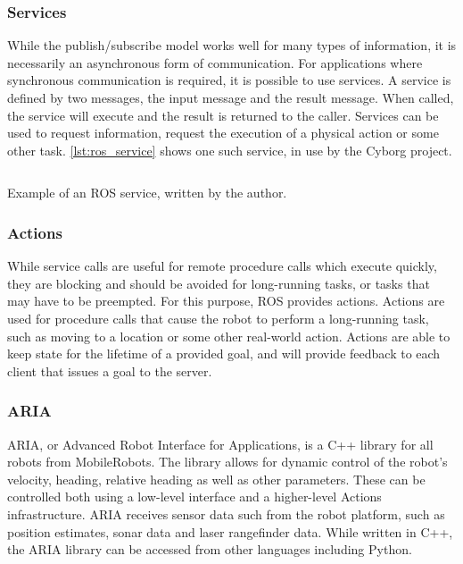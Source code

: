 \documentclass[\rootfolder/main.tex]{subfiles}
\begin{document}
\subsubsection{Services}

While the publish/subscribe model works well for many types of information, it is necessarily an asynchronous form of communication.
For applications where synchronous communication is required, it is possible to use services.
A service is defined by two messages, the input message and the result message.
When called, the service will execute and the result is returned to the caller.
Services can be used to request information, request the execution of a physical action or some other task.
\cref{lst:ros_service} shows one such service, in use by the Cyborg project.

\begin{listing}
    \inputminted{python}{\rootfolder/Chapters/Chapter2/Listings/distance_to_goal.py}
    \caption{Example of an ROS service, written by the author.}
    \label{lst:ros_service}
\end{listing}

\subsubsection{Actions}

While service calls are useful for remote procedure calls which execute quickly, they are blocking and should be avoided for long-running tasks, or tasks that may have to be preempted.
For this purpose, ROS provides actions.
Actions are used for procedure calls that cause the robot to perform a long-running task, such as moving to a location or some other real-world action.
Actions are able to keep state for the lifetime of a provided goal, and will provide feedback to each client that issues a goal to the server.

\subsubsection{ARIA}

ARIA, or Advanced Robot Interface for Applications, is a C++ library for all robots from MobileRobots.
The library allows for dynamic control of the robot's velocity, heading, relative heading as well as other parameters.
These can be controlled both using a low-level interface and a higher-level Actions infrastructure.
ARIA receives sensor data such from the robot platform, such as position estimates, sonar data and laser rangefinder data.
While written in C++, the ARIA library can be accessed from other languages including Python.
\end{document}
